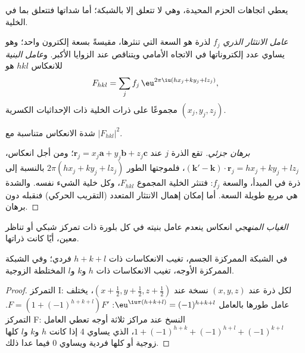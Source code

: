 يعطي  اتجاهات الحزم المحيدة، وهي لا تتعلق إلا
بالشبكة؛ أما شداتها فتتعلق بما في الخلية.

\begin{definition}\label{def:b3:x-ray-diffraction:structure-factor}
\emph{عامل الانتثار الذري} $f_j$ لذرة
هو السعة التي تنثرها، مقيسةً بسعة إلكترون واحد؛ وهو يساوي
عدد إلكتروناتها في الاتجاه الأمامي ويتناقص عند الزوايا
الأكبر. و\emph{عامل البنية} للانعكاس $hkl$ هو
\[
F_{hkl} = \sum_jf_j\,\eu^{2\pi\iu(hx_j + ky_j + lz_j)},
\]
مجموعًا على ذرات الخلية ذات الإحداثيات الكسرية $(x_j, y_j, z_j)$.
\end{definition}

\begin{proposition}[الشدة]\label{prop:b3:x-ray-diffraction:intensity}
شدة الانعكاس متناسبة مع $|F_{hkl}|^2$.
\end{proposition}

\begin{proof}[برهان جزئي]
تقع الذرة $j$ عند $\mathbf r_j = x_j\mathbf a + y_j\mathbf b + z_j\mathbf c$؛ ومن أجل انعكاس،
$(\mathbf k' - \mathbf k)\cdot\mathbf r_j = hx_j + ky_j + lz_j$، فلموجتها الطور
$2\pi(hx_j + ky_j + lz_j)$ بالنسبة إلى ذرة في المبدأ، والسعة $f_j$:
فتنثر الخلية المجموع $F_{hkl}$، وكل خلية الشيء نفسه. والشدة هي
مربع طويلة السعة. أما إمكان إهمال الانتثار المتعدد
(التقريب الحركي) فنقبله دون برهان.
\end{proof}

\begin{definition}\label{def:b3:x-ray-diffraction:absence}
\emph{الغياب المنهجي} انعكاس ينعدم عامل
بنيته في كل بلورة ذات تمركز شبكي أو
تناظر معين، أيًا كانت ذراتها.
\end{definition}

\begin{proposition}\label{prop:b3:x-ray-diffraction:absences}
في الشبكة الممركزة الجسم، تغيب الانعكاسات ذات $h + k + l$ فردي؛ وفي
الشبكة الممركزة الأوجه، تغيب الانعكاسات ذات $h$ و$k$ و$l$ المختلطة الزوجية.
\end{proposition}

\begin{proof}
التمركز I: لكل ذرة عند $(x,y,z)$ نسخة عند $(x + \frac12, y + \frac12, z + \frac12)$،
يختلف عامل طورها بالعامل $\eu^{\iu\pi(h+k+l)} = (-1)^{h+k+l}$: $F = (1 +
(-1)^{h+k+l})F'$. التمركز F: النسخ عند مراكز ثلاثة أوجه تعطي العامل $1 +
(-1)^{h+k} + (-1)^{h+l} + (-1)^{k+l}$، الذي يساوي 4 إذا كانت $h$ و$k$ و$l$ كلها زوجية أو كلها فردية
ويساوي 0 فيما عدا ذلك.
\end{proof}

